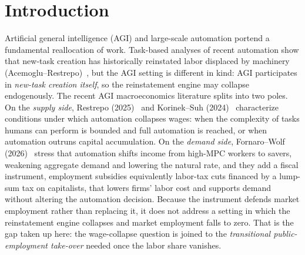 \documentclass[review,12pt]{elsarticle}
\theoremstyle{plain}
\theoremstyle{definition}
\theoremstyle{remark}
\begin{document}
\section{Introduction}
Artificial general intelligence (AGI) and large-scale automation portend a fundamental reallocation of work. Task-based analyses of recent automation show that new-task creation has historically reinstated labor displaced by machinery (Acemoglu--Restrepo)~\cite{AR2018}, but the AGI setting is different in kind: AGI participates in \emph{new-task creation itself}, so the reinstatement engine may collapse endogenously. The recent AGI macroeconomics literature splits into two poles. On the \emph{supply side}, Restrepo (2025)~\cite{Restrepo2025} and Korinek--Suh (2024)~\cite{KS2024} characterize conditions under which automation collapses wages: when the complexity of tasks humans can perform is bounded and full automation is reached, or when automation outruns capital accumulation. On the \emph{demand side}, Fornaro--Wolf (2026)~\cite{FW2026} stress that automation shifts income from high-MPC workers to savers, weakening aggregate demand and lowering the natural rate, and they add a fiscal instrument, employment subsidies equivalently labor-tax cuts financed by a lump-sum tax on capitalists, that lowers firms' labor cost and supports demand without altering the automation decision. Because the instrument defends market employment rather than replacing it, it does not address a setting in which the reinstatement engine collapses and market employment falls to zero. That is the gap taken up here: the wage-collapse question is joined to the \emph{transitional public-employment take-over} needed once the labor share vanishes.
\end{document}
